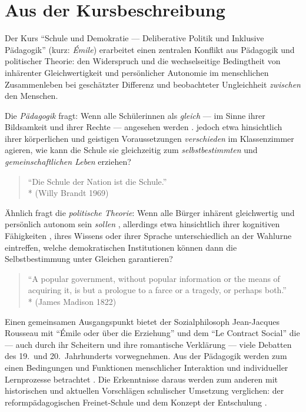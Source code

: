 \section[Kursbeschreibung]{Aus der Kursbeschreibung}

Der Kurs ``Schule und Demokratie --- Deliberative Politik und Inklusive Pädagogik'' (kurz: \emph{Émile}) erarbeitet einen zentralen Konflikt aus Pädagogik und politischer Theorie:
den Widerspruch und die wechselseitige Bedingtheit von inhärenter Gleichwertigkeit und persönlicher Autonomie im menschlichen Zusammenleben bei geschätzter Differenz und beobachteter Ungleichheit \emph{zwischen} den Menschen.

Die \emph{Pädagogik} fragt:
Wenn alle Schülerinnen als \emph{gleich} --- im Sinne ihrer Bildsamkeit und ihrer Rechte --- angesehen werden \parencites[vgl.][]{UN-2008,benner-2012}.
jedoch etwa hinsichtlich ihrer körperlichen und geistigen Voraussetzungen \emph{verschieden} im Klassenzimmer agieren, wie kann die Schule sie gleichzeitig zum \emph{selbstbestimmten} und \emph{gemeinschaftlichen Leben} erziehen?

\begin{quote}
    ``Die Schule der Nation ist die Schule.''\\*
    (Willy Brandt 1969)
\end{quote}

Ähnlich fragt die \emph{politische Theorie}:
Wenn alle Bürger inhärent gleichwertig und persönlich autonom sein \emph{sollen} \parencite[etwa][]{Dahl-1989-aa}, allerdings etwa hinsichtlich ihrer kognitiven Fähigkeiten \parencite{Rosenberg-2002-aa}, ihres Wissens \parencite[etwa][]{Converse-1970-aa} oder ihrer Sprache unterschiedlich an der Wahlurne eintreffen, welche demokratischen Institutionen können dann die Selbstbestimmung unter Gleichen garantieren?

\begin{quote}
    ``A popular government, without popular information or the means of acquiring it, is but a prologue to a farce or a tragedy, or perhaps both.''\\*
    (James Madison 1822)
\end{quote}

Einen gemeinsamen Ausgangspunkt bietet der Sozialphilosoph Jean-Jacques Rousseau mit ``Émile oder über die Erziehung'' \parencite*{rousseau-1762} und dem ``Le Contract Social'' \parencite*{Rousseau-1762-b} die --- auch durch ihr Scheitern und ihre romantische Verklärung --- viele Debatten des 19.\ und 20.\ Jahrhunderts vorwegnehmen.
Aus der Pädagogik werden zum einen Bedingungen und Funktionen menschlicher Interaktion und individueller Lernprozesse betrachtet \parencites{siebert-2003,benner-2012,mead-1934en}.
Die Erkenntnisse daraus werden zum anderen mit historischen und aktuellen Vorschlägen schulischer Umsetzung verglichen: der reformpädagogischen Freinet-Schule und dem Konzept der Entschulung \parencites{Freinet1979,Illich-1971}.

